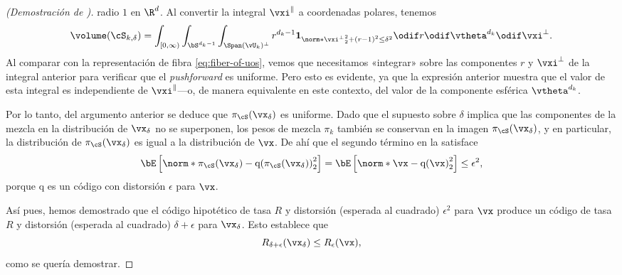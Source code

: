 \documentclass[../../book-main_es.tex]{subfiles}
\begin{document}
\begin{proof}[(Demostración de )]
    radio $1$ en $\R^d$. Al convertir la integral $\vxi^{\|}$ a coordenadas polares,
    tenemos
    \begin{equation}
        \volume(\cS_{k, \delta})
        = \int_{[0, \infty)} \int_{\bS^{d_k-1}} \int_{\Span(\vU_k)^\perp}
        r^{d_k-1}
        \mathbf{1}_{
            \norm*{\vxi^{\perp}}_2^2
            + \left( r - 1 \right)^2
            \leq
            \delta^{2}
        }
        \odif r \odif \vtheta^{d_k} \odif \vxi^{\perp}.
    \end{equation}
    Al comparar con la representación de fibra \eqref{eq:fiber-of-uos},
    vemos que necesitamos «integrar» sobre las componentes $r$ y $\vxi^\perp$
    de la integral anterior para verificar que el \textit{pushforward}
    es uniforme.
    Pero esto es evidente, ya que la expresión anterior muestra que el valor de esta
    integral es independiente de $\vxi^\|$---o, de manera equivalente en este contexto, del
    valor de la componente esférica $\vtheta^{d_k}$.

    Por lo tanto, del argumento anterior se deduce que $\pi_{\cS}(\vx_{\delta})$ es
    uniforme.
    Dado que el supuesto sobre $\delta$ implica que las componentes de la mezcla en
    la distribución de $\vx_{\delta}$ no se superponen, los pesos de mezcla
    $\pi_k$ también se conservan en la imagen $\pi_{\cS}(\vx_{\delta})$, y en
    particular, la distribución de $\pi_{\cS}(\vx_{\delta})$ es igual a la
    distribución de $\vx$.
    De ahí que el segundo término en la  satisface
    \begin{equation}
        \bE\left[ \norm*{ \pi_{\cS}(\vx_{\delta}) -
        \mathrm{q}(\pi_{\cS}(\vx_{\delta})) }_2^2 \right]
        =
        \bE\left[ \norm*{ \vx - \mathrm{q}(\vx) }_2^2 \right]
        \leq
        \epsilon^2,
    \end{equation}
    porque $\mathrm{q}$ es un código con distorsión $\epsilon$ para $\vx$.

    Así pues, hemos demostrado que el código hipotético de tasa $R$ y distorsión (esperada al cuadrado)
    $\epsilon^2$ para $\vx$ produce un código de tasa $R$ y distorsión (esperada al cuadrado)
    $\delta + \epsilon$ para $\vx_{\delta}$.
    Esto establece que
    \begin{equation}
        R_{\delta + \epsilon}(\vx_{\delta})
        \leq
        R_{\epsilon}(\vx),
    \end{equation}
    como se quería demostrar.

\end{proof}
\end{document}

